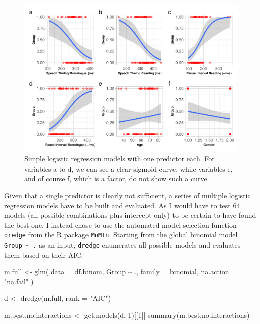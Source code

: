 \documentclass[
  english,
  doc,floatsintext]{apa6}
\newenvironment{Shaded}{\begin{snugshade}}{\end{snugshade}}
\newcommand{\AttributeTok}[1]{\textcolor[rgb]{0.77,0.63,0.00}{#1}}
\newcommand{\DecValTok}[1]{\textcolor[rgb]{0.00,0.00,0.81}{#1}}
\newcommand{\FunctionTok}[1]{\textcolor[rgb]{0.00,0.00,0.00}{#1}}
\newcommand{\NormalTok}[1]{#1}
\newcommand{\OtherTok}[1]{\textcolor[rgb]{0.56,0.35,0.01}{#1}}
\newcommand{\SpecialCharTok}[1]{\textcolor[rgb]{0.00,0.00,0.00}{#1}}
\newcommand{\StringTok}[1]{\textcolor[rgb]{0.31,0.60,0.02}{#1}}
\begin{document}
\begin{figure}

{\centering \includegraphics{dap_report_anja_probst_files/figure-latex/simple-logistic-regression-1} 

}

\caption{Simple logistic regression models with one predictor each. For variables a to d, we can see a clear sigmoid curve, while variables e, and of course f, which is a factor, do not show such a curve.}\label{fig:simple-logistic-regression}
\end{figure}

Given that a single predictor is clearly not sufficient, a series of multiple logistic regression models
have to be built and evaluated. As I would have to test 64 models (all possible combinations plus
intercept only) to be certain to have found the best one, I instead chose to use the automated model
selection function \texttt{dredge} from the R package \texttt{MuMIn}. Starting from the global binomial model
\texttt{Group\ \textasciitilde{}\ .} as an input, \texttt{dredge} enumerates all possible models and evaluates them based on their AIC.

\begin{Shaded}
\begin{Highlighting}[]
\NormalTok{m.full }\OtherTok{\textless{}{-}} \FunctionTok{glm}\NormalTok{(}
    \AttributeTok{data =}\NormalTok{ df.binom, Group }\SpecialCharTok{\textasciitilde{}}\NormalTok{ .,}
    \AttributeTok{family =}\NormalTok{ binomial,}
    \AttributeTok{na.action =} \StringTok{"na.fail"}
\NormalTok{)}

\NormalTok{d }\OtherTok{\textless{}{-}} \FunctionTok{dredge}\NormalTok{(m.full, }\AttributeTok{rank =} \StringTok{"AIC"}\NormalTok{)}

\NormalTok{m.best.no.interactions }\OtherTok{\textless{}{-}} \FunctionTok{get.models}\NormalTok{(d, }\DecValTok{1}\NormalTok{)[[}\DecValTok{1}\NormalTok{]]}
\FunctionTok{summary}\NormalTok{(m.best.no.interactions)}
\end{Highlighting}
\end{Shaded}
\end{document}
